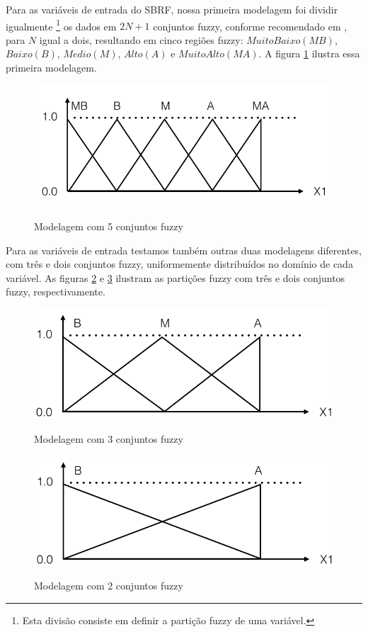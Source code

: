 \documentclass[template.tex]{subfiles}
\begin{document}
Para as variáveis de entrada do SBRF, nossa primeira modelagem foi dividir igualmente \footnote{Esta divisão consiste em definir a partição fuzzy de uma variável.} os dados em $2N + 1$ conjuntos fuzzy, conforme recomendado em \cite{wang1992generating}, para $N$ igual a dois, resultando em cinco regiões fuzzy: $Muito Baixo (MB)$, $Baixo (B)$, $Medio (M)$, $Alto (A)$ e $Muito Alto (MA)$. A figura \ref{figura:cinco_conjuntos_fuzzy} ilustra essa primeira modelagem.

\begin{figure}[H]
\caption{Modelagem com 5 conjuntos fuzzy}
\centering
\includegraphics[scale=0.45]{cinco_conjuntos_fuzzy.png}
\label{figura:cinco_conjuntos_fuzzy}
\end{figure}

Para as variáveis de entrada testamos também outras duas modelagens diferentes, com três e dois conjuntos fuzzy, uniformemente distribuídos no domínio de cada variável. As figuras \ref{figura:tres_conjuntos_fuzzy} e \ref{figura:conjuntos_fuzzy_entrada_final} ilustram as partições fuzzy com três e dois conjuntos fuzzy, respectivamente.

\begin{figure}[H]
\caption{Modelagem com 3 conjuntos fuzzy}
\centering
\includegraphics[scale=0.45]{tres_conjuntos_fuzzy.png}
\label{figura:tres_conjuntos_fuzzy}
\end{figure}

\begin{figure}[H]
\caption{Modelagem com 2 conjuntos fuzzy}
\centering
\includegraphics[scale=0.45]{conjuntos_fuzzy_entrada_final.png}
\label{figura:conjuntos_fuzzy_entrada_final}
\end{figure}
\end{document}
